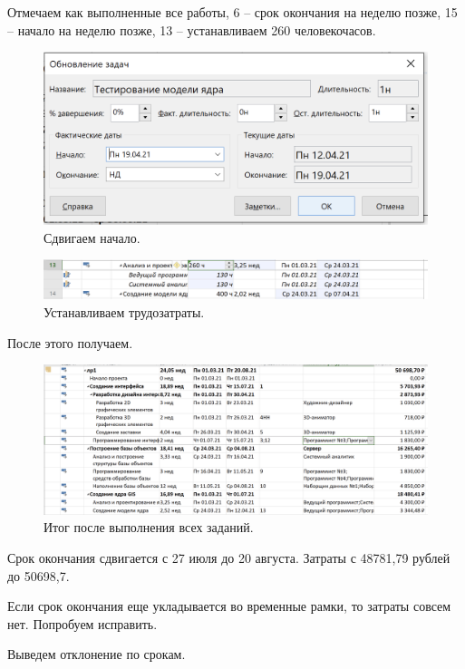 \documentclass[a4paper,14pt]{extreport} %
\begin{document}
\begin{enumerate}
Отмечаем как выполненные все работы, 6 -- срок окончания на неделю позже, 15 -- начало на неделю позже, 13 -- устанавливаем 260 человекочасов.

\begin{figure}[H]
  \centering
  \caption{Сдвигаем начало. }
  \includegraphics[scale=0.7]{12}
\end{figure}

\begin{figure}[H]
  \centering
  \caption{Устанавливаем трудозатраты. }
  \includegraphics[scale=0.5]{13}
\end{figure}

После этого получаем.

\begin{figure}[H]
  \centering
  \caption{Итог после выполнения всех заданий. }
  \includegraphics[scale=0.5]{14}
\end{figure}

Срок окончания сдвигается с 27 июля до 20 августа. Затраты с 48781,79 рублей до 50698,7.

Если срок окончания еще укладывается во временные рамки, то затраты совсем нет. Попробуем исправить.

Выведем отклонение по срокам.


\end{enumerate}
\end{document}
